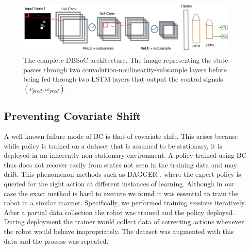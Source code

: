 \documentclass[letterpaper, 10 pt, conference]{ieeeconf}
\begin{document}
  	\begin{figure}[tbh]
	\centering
    \includegraphics[scale = 0.21]{images/arch.png}
  \caption{The complete DBSoC architecture. The image representing the state passes through two convolution-nonlinearity-subsample layers before being fed through two LSTM layers that output the control signals $(v_{pred},\omega_{pred})$. }

  \label{fig:arch}
  \end{figure}
  
\subsection{Preventing Covariate Shift}
A well known failure mode of BC is that of covariate shift. This arises because while policy is trained on a dataset that is assumed to be stationary, it is deployed in an inherently non-stationary environment. A policy trained using BC thus does not recover easily from states not seen in the training data and may drift. This phenomenon methods such as DAGGER \cite{ross2011reduction}, where the expert policy is queried for the right action at different instances of learning. Although in our case the exact method is hard to execute we found it was essential to train the robot in a similar manner. Specifically, we performed training sessions iteratively. After a partial data collection the robot was trained and the policy deployed. During deployment the trainer would collect data of correcting actions whenever the robot would behave inapropriately. The dataset was augmented with this data and the process was repeated.   

\end{document}
